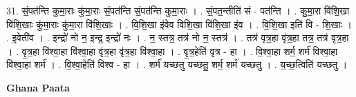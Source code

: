 \documentclass[17pt]{extarticle}
\begin{document}
31. सं॒पत॑न्ति कुमा॒राः कु॑मा॒राः सं॒पत॑न्ति सं॒पत॑न्ति कुमा॒राः । . सं॒पत॒न्तीति॑ सं - पत॑न्ति । . कु॒मा॒रा वि॑शि॒खा वि॑शि॒खाः कु॑मा॒राः कु॑मा॒रा वि॑शि॒खाः । . वि॒शि॒खा इ॑वेव विशि॒खा वि॑शि॒खा इ॑व । . वि॒शि॒खा इति॑ वि - शि॒खाः । . इ॒वेती॑व । . इन्द्रो॑ नो न॒ इन्द्र॒ इन्द्रो॑ नः । . न॒ स्तत्र॒ तत्र॑ नो न॒ स्तत्र॑ । . तत्र॑ वृत्र॒हा वृ॑त्र॒हा तत्र॒ तत्र॑ वृत्र॒हा । . वृ॒त्र॒हा वि॑श्वा॒हा वि॑श्वा॒हा वृ॑त्र॒हा वृ॑त्र॒हा वि॑श्वा॒हा । . वृ॒त्र॒हेति॑ वृत्र - हा । . वि॒श्वा॒हा शर्म॒ शर्म॑ विश्वा॒हा वि॑श्वा॒हा शर्म॑ । . वि॒श्वा॒हेति॑ विश्व - हा । . शर्म॑ यच्छतु यच्छतु॒ शर्म॒ शर्म॑ यच्छतु । . य॒च्छ॒त्विति॑ यच्छतु । \newline

\textbf{Ghana Paata } \newline
\end{document}
